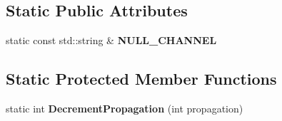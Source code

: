 \subsection*{Static Public Attributes}
\begin{DoxyCompactItemize}
\item 
\hypertarget{class_buffered_transformation_ad818087c6e1f0ca3d5efb356361f73ab}{
static const std::string \& {\bfseries NULL\_\-CHANNEL}}
\label{class_buffered_transformation_ad818087c6e1f0ca3d5efb356361f73ab}

\end{DoxyCompactItemize}
\subsection*{Static Protected Member Functions}
\begin{DoxyCompactItemize}
\item 
\hypertarget{class_buffered_transformation_a0dc1428070dce0ce5651d775593ccce0}{
static int {\bfseries DecrementPropagation} (int propagation)}
\label{class_buffered_transformation_a0dc1428070dce0ce5651d775593ccce0}

\end{DoxyCompactItemize}
